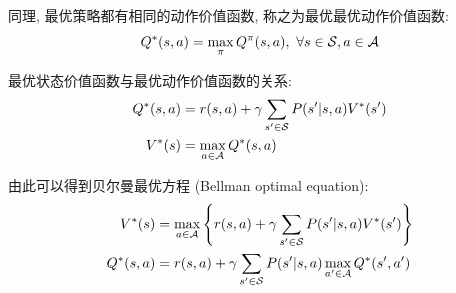 \begin{definition}[最优动作价值函数]
    同理, 最优策略都有相同的动作价值函数, 称之为最优最优动作价值函数:
    \begin{align*}
        Q^*(s,a)=\max_\pi Q^\pi(s,a),\ \forall s\in \mathcal{S},a\in\mathcal{A}
    \end{align*}
\end{definition}

最优状态价值函数与最优动作价值函数的关系:
\begin{align*}
    Q^*(s,a) &= r(s,a)+\gamma\sum_{s'\in\mathcal{S}} P(s'|s,a)V^*(s')\\
    V^*(s)&=\max_{a\in \mathcal{A}}Q^*(s,a)
\end{align*}

由此可以得到贝尔曼最优方程 (Bellman optimal equation):
\begin{align*}
    V^*(s)&=\max_{a\in\mathcal{A}}\left\{ r(s,a) + \gamma \sum_{s'\in\mathcal{S}} P(s'|s,a) V^*(s') \right\}\\
    Q^*(s,a) &= r(s,a) + \gamma \sum_{s'\in\mathcal{S}} P(s'|s,a)\max_{a'\in\mathcal{A}}Q^*(s', a')
\end{align*}